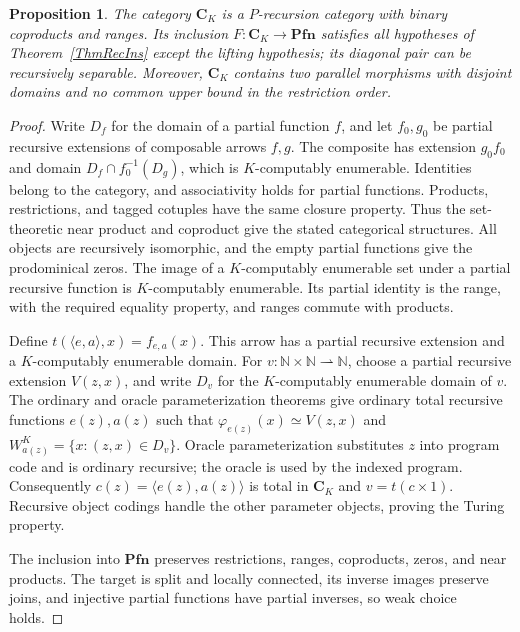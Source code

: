 \documentclass[letterpaper,10pt]{amsart}
\theoremstyle{plain}
\newtheorem{prop}{Proposition}[thm]
\theoremstyle{definition}
\begin{document}
\begin{prop}\label{PropCounterexample}
The category $\mathbf C_K$ is a $P$-recursion category with binary
coproducts and ranges. Its inclusion $F:\mathbf C_K\to\mathbf{Pfn}$
satisfies all hypotheses of Theorem~\ref{ThmRecIns} except the lifting
hypothesis; its diagonal pair can be recursively separable.
Moreover, $\mathbf C_K$ contains two parallel morphisms with disjoint
domains and no common upper bound in the restriction order.
\end{prop}
\begin{proof}
Write $D_f$ for the domain of a partial function $f$, and let $f_0,g_0$
be partial recursive extensions of composable arrows $f,g$.
The composite has extension $g_0f_0$ and domain
$D_f\cap f_0^{-1}(D_g)$, which is $K$-computably enumerable.
Identities belong to the category, and associativity holds for partial
functions. Products, restrictions, and tagged cotuples have the same
closure property. Thus the set-theoretic near product and coproduct give
the stated categorical structures. All objects are recursively isomorphic,
and the empty partial functions give the prodominical zeros.
The image of a $K$-computably enumerable set under a partial recursive
function is $K$-computably enumerable. Its partial identity is the range,
with the required equality property, and ranges commute with products.

Define $t(\langle e,a\rangle,x)=f_{e,a}(x)$. This arrow has a
partial recursive extension and a $K$-computably enumerable domain.
For $v:\mathbb N\times\mathbb N\rightharpoonup\mathbb N$, choose a
partial recursive extension $V(z,x)$, and write $D_v$ for the
$K$-computably enumerable domain of $v$. The ordinary and oracle
parameterization theorems \cite{MR90d:03072} give
ordinary total recursive functions $e(z),a(z)$ such that
$\varphi_{e(z)}(x)\simeq V(z,x)$ and
$W_{a(z)}^K=\{x:(z,x)\in D_v\}$.
Oracle parameterization substitutes $z$ into program code and is
ordinary recursive; the oracle is used by the indexed program.
Consequently $c(z)=\langle e(z),a(z)\rangle$ is total in $\mathbf C_K$
and $v=t(c\times1)$. Recursive object codings handle the other
parameter objects, proving the Turing property.

The inclusion into $\mathbf{Pfn}$ preserves restrictions, ranges,
coproducts, zeros, and near products. The target is split and locally
connected, its inverse images preserve joins, and injective partial
functions have partial inverses, so weak choice holds.


\end{proof}
\end{document}
